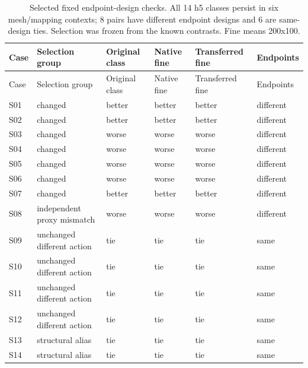 \FloatBarrier\begingroup\fontsize{8.5}{10.5}\selectfont\setlength\tabcolsep{3pt}
\begin{longtable}{@{}>{\raggedright\arraybackslash}p{}>{\raggedright\arraybackslash}p{}>{\raggedright\arraybackslash}p{}>{\raggedright\arraybackslash}p{}>{\raggedright\arraybackslash}p{}>{\raggedright\arraybackslash}p{}@{}}
\caption{Selected fixed endpoint-design checks. All 14 h5 classes persist in six mesh/mapping contexts; 8 pairs have different endpoint designs and 6 are same-design ties. Selection was frozen from the known contrasts. Fine means 200x100.}\label{tab:extension_mesh}\tabularnewline
\toprule
Case & Selection group & Original class & Native fine & Transferred fine & Endpoints \\
\midrule
\endfirsthead
\toprule
Case & Selection group & Original class & Native fine & Transferred fine & Endpoints \\
\midrule
\endhead
\bottomrule
\endlastfoot
S01 & changed & better & better & better & different \\
S02 & changed & better & better & better & different \\
S03 & changed & worse & worse & worse & different \\
S04 & changed & worse & worse & worse & different \\
S05 & changed & worse & worse & worse & different \\
S06 & changed & worse & worse & worse & different \\
S07 & changed & better & better & better & different \\
S08 & independent proxy mismatch & worse & worse & worse & different \\
S09 & unchanged different action & tie & tie & tie & same \\
S10 & unchanged different action & tie & tie & tie & same \\
S11 & unchanged different action & tie & tie & tie & same \\
S12 & unchanged different action & tie & tie & tie & same \\
S13 & structural alias & tie & tie & tie & same \\
S14 & structural alias & tie & tie & tie & same \\
\end{longtable}
\endgroup

